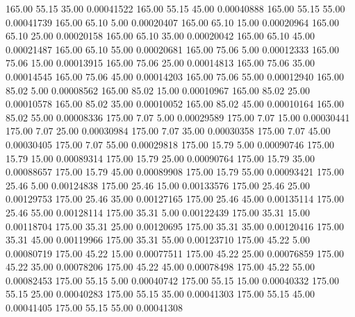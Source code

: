     165.00     55.15     35.00     0.00041522
    165.00     55.15     45.00     0.00040888
    165.00     55.15     55.00     0.00041739
    165.00     65.10      5.00     0.00020407
    165.00     65.10     15.00     0.00020964
    165.00     65.10     25.00     0.00020158
    165.00     65.10     35.00     0.00020042
    165.00     65.10     45.00     0.00021487
    165.00     65.10     55.00     0.00020681
    165.00     75.06      5.00     0.00012333
    165.00     75.06     15.00     0.00013915
    165.00     75.06     25.00     0.00014813
    165.00     75.06     35.00     0.00014545
    165.00     75.06     45.00     0.00014203
    165.00     75.06     55.00     0.00012940
    165.00     85.02      5.00     0.00008562
    165.00     85.02     15.00     0.00010967
    165.00     85.02     25.00     0.00010578
    165.00     85.02     35.00     0.00010052
    165.00     85.02     45.00     0.00010164
    165.00     85.02     55.00     0.00008336
    175.00      7.07      5.00     0.00029589
    175.00      7.07     15.00     0.00030441
    175.00      7.07     25.00     0.00030984
    175.00      7.07     35.00     0.00030358
    175.00      7.07     45.00     0.00030405
    175.00      7.07     55.00     0.00029818
    175.00     15.79      5.00     0.00090746
    175.00     15.79     15.00     0.00089314
    175.00     15.79     25.00     0.00090764
    175.00     15.79     35.00     0.00088657
    175.00     15.79     45.00     0.00089908
    175.00     15.79     55.00     0.00093421
    175.00     25.46      5.00     0.00124838
    175.00     25.46     15.00     0.00133576
    175.00     25.46     25.00     0.00129753
    175.00     25.46     35.00     0.00127165
    175.00     25.46     45.00     0.00135114
    175.00     25.46     55.00     0.00128114
    175.00     35.31      5.00     0.00122439
    175.00     35.31     15.00     0.00118704
    175.00     35.31     25.00     0.00120695
    175.00     35.31     35.00     0.00120416
    175.00     35.31     45.00     0.00119966
    175.00     35.31     55.00     0.00123710
    175.00     45.22      5.00     0.00080719
    175.00     45.22     15.00     0.00077511
    175.00     45.22     25.00     0.00076859
    175.00     45.22     35.00     0.00078206
    175.00     45.22     45.00     0.00078498
    175.00     45.22     55.00     0.00082453
    175.00     55.15      5.00     0.00040742
    175.00     55.15     15.00     0.00040332
    175.00     55.15     25.00     0.00040283
    175.00     55.15     35.00     0.00041303
    175.00     55.15     45.00     0.00041405
    175.00     55.15     55.00     0.00041308
